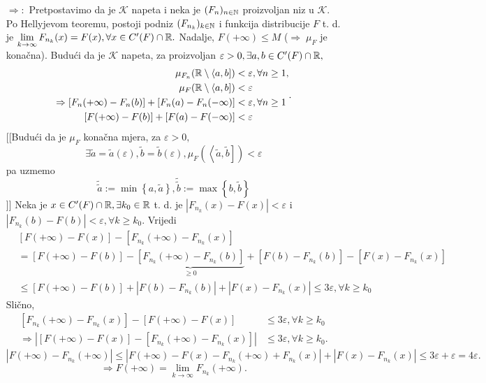 \documentclass{article}
\begin{document}
\begin{enumerate}
    \item[\(\boxed{\Rightarrow}:\)] Pretpostavimo da je \(\mathcal K\) napeta i neka je \((F_n)_{n\in\Bbb N}\) proizvoljan niz u \(\mathcal K.\) Po Hellyjevom teoremu, postoji podniz \((F_{n_k})_{k\in\Bbb N}\) i funkcija distribucije \(F\) t. d. je \(\lim\limits_{k\to\infty}F_{n_k}(x)=F(x),\forall x\in C'(F)\cap\Bbb R.\) Nadalje, \(F(+\infty)\le M\) (\(\Rightarrow\;\mu_F\) je konačna). Budući da je \(\mathcal K\) napeta, za proizvoljan \(\varepsilon>0,\exists a,b\in C'(F)\cap\Bbb R,\) \[\begin{aligned}\mu_{F_n}(\Bbb R\setminus\langle a,b])&<\varepsilon,\forall n\ge 1,\\\mu_F(\Bbb R\setminus\langle a,b])&<\varepsilon\\\Rightarrow[F_n(+\infty)-F_n(b)]+[F_n(a)-F_n(-\infty)] &<\varepsilon,\forall n\ge1\\ [F(+\infty)-F(b)]+[F(a)-F(-\infty)]&<\varepsilon\end{aligned}.\] \textcolor{NavyBlue}{[[Budući da je \(\mu_F\) konačna mjera, za \(\varepsilon>0,\)\[\exists\tilde a=\tilde a(\varepsilon),\tilde b=\tilde b(\varepsilon),\mu_F\left(\left\langle\tilde a,\tilde b\right]\right)<\varepsilon\] pa uzmemo \[\tilde{\tilde a}:=\min\left\{a,\tilde a\right\},\tilde{\tilde b}:=\max\left\{b,\tilde b\right\}\]]]}  Neka je \(x\in C'(F)\cap\Bbb R,\exists k_0\in\Bbb R\) t. d. je \(|F_{n_k}(x)-F(x)|<\varepsilon\) i \(|F_{n_k}(b)-F(b)|<\varepsilon,\forall k\ge k_0.\) Vrijedi \[\begin{aligned}&[F(+\infty)-F(x)]-[F_{n_k}(+\infty)-F_{n_k}(x)]\\&=[F(+\infty)-F(b)]-\underbrace{[F_{n_k}(+\infty)-F_{n_k}(b)]}_{\ge0}+[F(b)-F_{n_k}(b)]-[F(x)-F_{n_k}(x)]\\&\le[F(+\infty)-F(b)]+|F(b)-F_{n_k}(b)|+|F(x)-F_{n_k}(x)|\le3\varepsilon,\forall k\ge k_0\end{aligned}\] Slično, \[\begin{aligned}[F_{n_k}(+\infty)-F_{n_k}(x)]-[F(+\infty)-F(x)]&\le 3\varepsilon,\forall k\ge k_0\\\Rightarrow|[F(+\infty)-F(x)]-[F_{n_k}(+\infty)-F_{n_k}(x)]|&\le 3\varepsilon,\forall k\ge k_0.\end{aligned}\] \[|F(+\infty)-F_{n_k}(+\infty)|\le|F(+\infty)-F(x)-F_{n_k}(+\infty)+F_{n_k}(x)|+|F(x)-F_{n_k}(x)|\le 3\varepsilon+\varepsilon=4\varepsilon.\]  \[\Rightarrow F(+\infty)=\lim_{k\to\infty}F_{n_k}(+\infty).\]

\end{enumerate}
\end{document}
